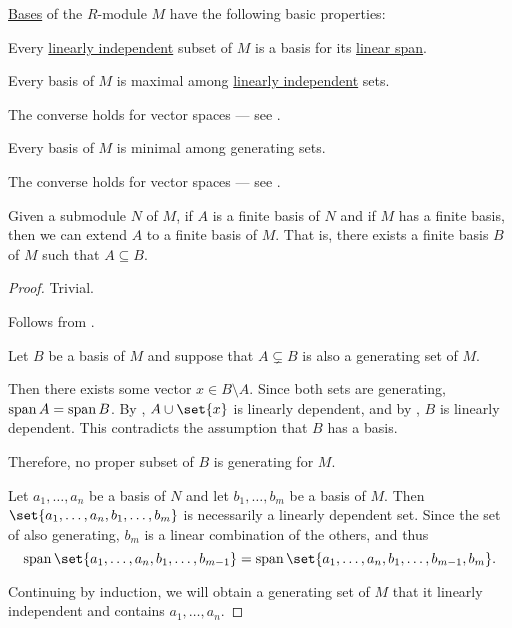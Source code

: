 \begin{proposition}\label{thm:def:hamel_basis}
  \hyperref[def:hamel_basis]{Bases} of the \( R \)-module \( M \) have the following basic properties:
  \begin{thmenum}
     Every \hyperref[def:linear_dependence]{linearly independent} subset of \( M \) is a basis for its \hyperref[def:semimodule/submodel]{linear span}.

     Every basis of \( M \) is maximal among \hyperref[thm:def:linear_dependence]{linearly independent} sets.

    The converse holds for vector spaces --- see .

     Every basis of \( M \) is minimal among generating sets.

    The converse holds for vector spaces --- see .

     Given a submodule \( N \) of \( M \), if \( A \) is a finite basis of \( N \) and if \( M \) has a finite basis, then we can extend \( A \) to a finite basis of \( M \). That is, there exists a finite basis \( B \) of \( M \) such that \( A \subseteq B \).
  \end{thmenum}
\end{proposition}
\begin{proof}
   Trivial.

   Follows from .

   Let \( B \) be a basis of \( M \) and suppose that \( A \subsetneq B \) is also a generating set of \( M \).

  Then there exists some vector \( x \in B \setminus A \). Since both sets are generating, \( \operatorname{span} A = \operatorname{span} B \). By , \( A \cup \set{ x } \) is linearly dependent, and by , \( B \) is linearly dependent. This contradicts the assumption that \( B \) has a basis.

  Therefore, no proper subset of \( B \) is generating for \( M \).

   Let \( a_1, \ldots, a_n \) be a basis of \( N \) and let \( b_1, \ldots, b_m \) be a basis of \( M \). Then \( \set{ a_1, \ldots, a_n, b_1, \ldots, b_m } \) is necessarily a linearly dependent set. Since the set of also generating, \( b_m \) is a linear combination of the others, and thus
  \begin{equation*}
    \linspan\set{ a_1, \ldots, a_n, b_1, \ldots, b_{m-1} } = \linspan\set{ a_1, \ldots, a_n, b_1, \ldots, b_{m-1}, b_m }.
  \end{equation*}

  Continuing by induction, we will obtain a generating set of \( M \) that it linearly independent and contains \( a_1, \ldots, a_n \).
\end{proof}

